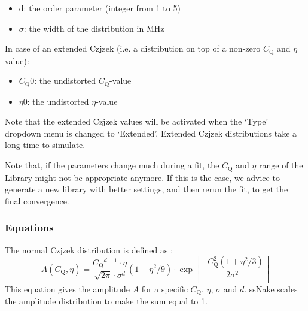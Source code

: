 \documentclass[11pt,a4paper]{article}
\begin{document}
\begin{itemize}
\item d: the order parameter (integer from 1 to 5)
\item $\sigma$: the width of the distribution in MHz
\end{itemize}
In case of an extended Czjzek (i.e. a distribution on top of a non-zero $C_\text{Q}$ and $\eta$
value):
\begin{itemize}
  \item $C_\text{Q}0$: the undistorted $C_\text{Q}$-value
  \item $\eta0$: the undistorted $\eta$-value
\end{itemize}
Note that the extended Czjzek values will be activated when the `Type' dropdown menu is changed to
`Extended'. Extended Czjzek distributions take a long time to simulate. 

Note that, if the parameters change much during a fit, the $C_\text{Q}$ and $\eta$ range of the
Library might not be appropriate anymore. If this is the case, we advice to generate a new library
with better settings, and then rerun the fit, to get the final convergence.


\subsubsection*{Equations}

The normal Czjzek distribution is defined as \cite{Grimminck2011Easy}:
\begin{equation}
  A(C_\text{Q},\eta) = \frac{C_\text{Q}{}^{d - 1} \cdot \eta}{\sqrt{2\pi} \cdot \sigma^d} (1 - \eta^2 / 9) \cdot
  \exp\left[\frac{-C_\text{Q}^2 (1 + \eta^2/3)} {2\sigma^2}   \right]
\end{equation}
This equation gives the amplitude $A$ for a specific $C_\text{Q}$, $\eta$, $\sigma$ and $d$. ssNake
scales the amplitude distribution to make the sum equal to 1.
\end{document}
